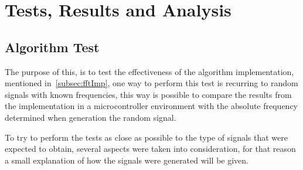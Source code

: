 \cleardoublepage
\chapter{Tests, Results and Analysis}\label{chap:Tests}
\section{Algorithm Test}
The purpose of this, is to test the effectiveness of the algorithm implementation, mentioned in~\ref{subsec:fftImp}, one way to perform this test is recurring to random signals with known frequencies, this way is possible to compare the results from the implementation in a microcontroller environment with the absolute frequency determined when generation the random signal.

To try to perform the tests as close as possible to the type of signals that were expected to obtain, several aspects were taken into consideration, for that reason a small explanation of how the signals were generated will be given. 

